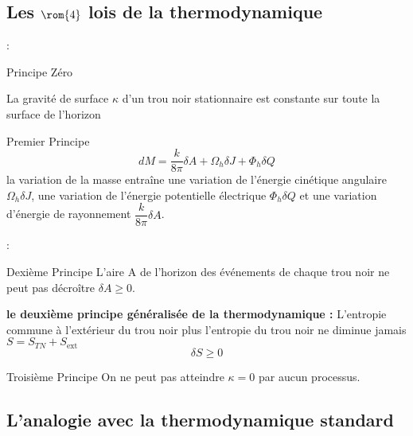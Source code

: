 \subsection{Les $\rom{4}$ lois de la thermodynamique}
\begin{frame}{\underline{\secname} : {\small \subsecname}}

\begin{block}{Principe Zéro}
	
	La gravité de surface $\kappa$ d'un trou noir stationnaire est constante sur toute la surface de l'horizon	
\end{block}
\begin{block}{Premier Principe}
	$$dM=\dfrac{k}{8\pi}\delta A+\Omega_{h}\delta J+\Phi_{h}\delta Q$$
	la variation de la masse entraîne une variation de l'énergie cinétique angulaire $\Omega_{h}\delta J$, une variation de l'énergie potentielle électrique $\Phi_{h}\delta Q$ et une variation d'énergie de rayonnement $\dfrac{k}{8\pi}\delta A$.
\end{block}

\end{frame}

\begin{frame}{\underline{\secname} : {\small \subsecname}}
\begin{block}{Dexième Principe}
 L'aire A de l'horizon des événements de chaque trou noir ne peut pas décroître $\delta A\geq 0$. 

\vspace{10pt}

\textbf{le deuxième principe généralisée de la thermodynamique :} L'entropie commune à l'extérieur du trou noir plus l'entropie du trou noir ne diminue jamais $S=S_{T N}+S_{\text{ext}}$
$$
\delta S \geq 0
$$


\end{block}
\begin{block}{Troisième Principe}
 On ne peut pas atteindre $\kappa = 0$ par aucun processus.
\end{block}

\end{frame}


\subsection{L’analogie avec la thermodynamique standard}


